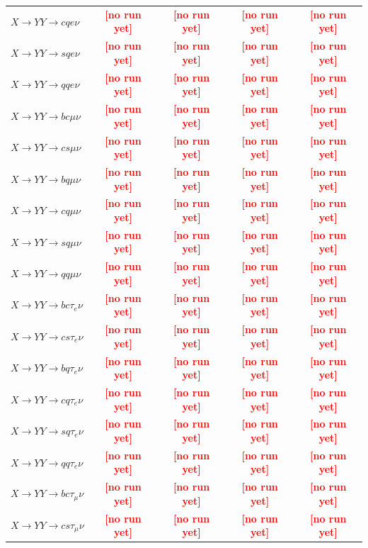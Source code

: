 \documentclass[12pt]{article}   %
\newcommand{\pending}[1]{\textcolor{red}{\textbf{[#1]}}}
\begin{document}
\begin{landscape}
{\begin{longtable}{@{\extracolsep{\fill}}lcccc@{}}
$X\to YY\to cqe\nu$ & \pending{no run yet} & \pending{no run yet} & \pending{no run yet} & \pending{no run yet} \\
$X\to YY\to sqe\nu$ & \pending{no run yet} & \pending{no run yet} & \pending{no run yet} & \pending{no run yet} \\
$X\to YY\to qqe\nu$ & \pending{no run yet} & \pending{no run yet} & \pending{no run yet} & \pending{no run yet} \\
$X\to YY\to bc\mu\nu$ & \pending{no run yet} & \pending{no run yet} & \pending{no run yet} & \pending{no run yet} \\
$X\to YY\to cs\mu\nu$ & \pending{no run yet} & \pending{no run yet} & \pending{no run yet} & \pending{no run yet} \\
$X\to YY\to bq\mu\nu$ & \pending{no run yet} & \pending{no run yet} & \pending{no run yet} & \pending{no run yet} \\
$X\to YY\to cq\mu\nu$ & \pending{no run yet} & \pending{no run yet} & \pending{no run yet} & \pending{no run yet} \\
$X\to YY\to sq\mu\nu$ & \pending{no run yet} & \pending{no run yet} & \pending{no run yet} & \pending{no run yet} \\
$X\to YY\to qq\mu\nu$ & \pending{no run yet} & \pending{no run yet} & \pending{no run yet} & \pending{no run yet} \\
\midrule
$X\to YY\to bc\tau_e\nu$ & \pending{no run yet} & \pending{no run yet} & \pending{no run yet} & \pending{no run yet} \\
$X\to YY\to cs\tau_e\nu$ & \pending{no run yet} & \pending{no run yet} & \pending{no run yet} & \pending{no run yet} \\
$X\to YY\to bq\tau_e\nu$ & \pending{no run yet} & \pending{no run yet} & \pending{no run yet} & \pending{no run yet} \\
$X\to YY\to cq\tau_e\nu$ & \pending{no run yet} & \pending{no run yet} & \pending{no run yet} & \pending{no run yet} \\
$X\to YY\to sq\tau_e\nu$ & \pending{no run yet} & \pending{no run yet} & \pending{no run yet} & \pending{no run yet} \\
$X\to YY\to qq\tau_e\nu$ & \pending{no run yet} & \pending{no run yet} & \pending{no run yet} & \pending{no run yet} \\
$X\to YY\to bc\tau_\mu\nu$ & \pending{no run yet} & \pending{no run yet} & \pending{no run yet} & \pending{no run yet} \\
$X\to YY\to cs\tau_\mu\nu$ & \pending{no run yet} & \pending{no run yet} & \pending{no run yet} & \pending{no run yet} \\

\end{longtable}}
\end{landscape}
\end{document}
